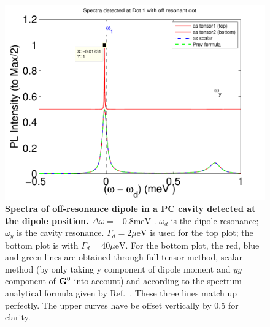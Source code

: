 \begin{figure}[H]
\centering
\begin{center}
\includegraphics[width=14cm]{./Figs/sp84_11_1}
\end{center}
\caption[Spectra of off-resonance dipole in a PC cavity.]{\textbf{Spectra of off-resonance dipole in a PC cavity detected at the dipole position. $\Delta \omega = -0.8 {\text {meV}}$ }. $\omega_d$ is the dipole resonance; $\omega_y$ is the cavity resonance. $\Gamma_d = 2 \mu{\text {eV}}$ is used for the top plot; the bottom plot is with $\Gamma_d = 40 \mu{\text {eV}}$. For the bottom plot, the red, blue and green lines are obtained through full tensor method, scalar method (by only taking y component of dipole moment and $yy$ component of $\mathbf{G}^0$ into account) and according to the spectrum analytical formula given by Ref.~\cite{Hughes2009}. These three lines match up perfectly. The upper curves have be offset vertically by 0.5 for clarity. }
\label{sp84_11_1}
\end{figure}


